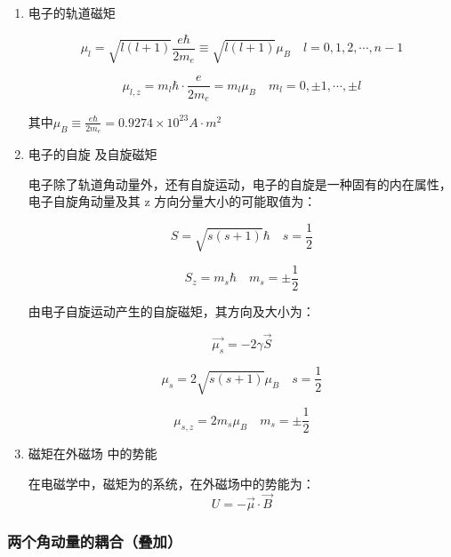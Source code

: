 \documentclass[dvipsnames, svgnames,a4paper,11pt]{article}
\begin{document}
	\begin{enumerate}
		\item 电子的轨道磁矩

			\[
				\mu_l = \sqrt{l(l+1)}\frac{e \hbar}{2 m_e} \equiv \sqrt{l(l+1)}\mu_B \quad l=0,1,2,\cdots , n-1	
			\]

			\[
				\mu_{l,z} = m_l \hbar \cdot \frac{e}{2 m_e} = m_l \mu_B \quad m_l = 0,\pm 1,\cdots ,\pm l	
			\]

			其中$\mu_B \equiv \frac{e \hbar}{2 m_e} =0.9274 \times 10^{23} A\cdot m^2$


		\item 电子的自旋 及自旋磁矩
		
			电子除了轨道角动量外，还有自旋运动，电子的自旋是一种固有的内在属性，电子自旋角动量及其 z 方向分量大小的可能取值为：

			\[
				S = \sqrt{s(s+1)}\hbar \quad s = \frac{1}{2}	
			\]

			\[
				S_z = m_s \hbar \quad m_s = \pm \frac{1}{2}	
			\]


			由电子自旋运动产生的自旋磁矩，其方向及大小为：

			\[
				\vec{\mu_s} = -2 \gamma \vec{S}
			\]

			\[
				\mu_s = 2\sqrt{s(s+1)}\mu_B \quad s = \frac{1}{2}
			\]

			\[
				\mu_{s,z} = 2 m_s \mu_B \quad m_s = \pm \frac{1}{2}
			\]

		\item 磁矩在外磁场 中的势能
				
			在电磁学中，磁矩为的系统，在外磁场中的势能为：
			\[
				U = - \vec{\mu} \cdot \vec{B}
			\]	
				
	\end{enumerate}


\subsubsection{两个角动量的耦合（叠加）}
\end{document}
